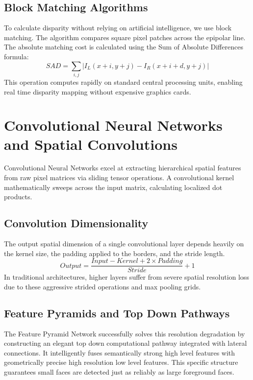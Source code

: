 \documentclass[12pt,a4paper]{report}
\begin{document}
\subsection{Block Matching Algorithms}
To calculate disparity without relying on artificial intelligence, we use block matching. The algorithm compares square pixel patches across the epipolar line. The absolute matching cost is calculated using the Sum of Absolute Differences formula:
\begin{equation}
SAD = \sum_{i,j} | I_L(x+i, y+j) - I_R(x+i+d, y+j) |
\end{equation}
This operation computes rapidly on standard central processing units, enabling real time disparity mapping without expensive graphics cards.

\section{Convolutional Neural Networks and Spatial Convolutions}
Convolutional Neural Networks excel at extracting hierarchical spatial features from raw pixel matrices via sliding tensor operations. A convolutional kernel mathematically sweeps across the input matrix, calculating localized dot products.

\subsection{Convolution Dimensionality}
The output spatial dimension of a single convolutional layer depends heavily on the kernel size, the padding applied to the borders, and the stride length.
\begin{equation}
Output = \frac{Input - Kernel + 2 \times Padding}{Stride} + 1
\end{equation}
In traditional architectures, higher layers suffer from severe spatial resolution loss due to these aggressive strided operations and max pooling grids.

\subsection{Feature Pyramids and Top Down Pathways}
The Feature Pyramid Network successfully solves this resolution degradation by constructing an elegant top down computational pathway integrated with lateral connections. It intelligently fuses semantically strong high level features with geometrically precise high resolution low level features. This specific structure guarantees small faces are detected just as reliably as large foreground faces.
\end{document}

